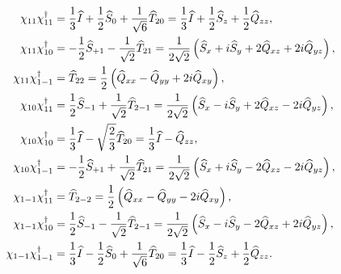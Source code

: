 \begin{align}
\chi_{11} \chi_{11}^{\dagger} & =\frac{1}{3} \widehat{I}+\frac{1}{2} \widehat{S}_{0}+\frac{1}{\sqrt{6}} \widehat{T}_{20}=\frac{1}{3} \widehat{I}+\frac{1}{2} \widehat{S}_{z}+\frac{1}{2} \widehat{Q}_{z z}, \notag\\
\chi_{11} \chi_{10}^{\dagger} & =-\frac{1}{2} \widehat{S}_{+1}-\frac{1}{\sqrt{2}} \widehat{T}_{21}=\frac{1}{2 \sqrt{2}}\left(\widehat{S}_{x}+i \widehat{S}_{y}+2 \widehat{Q}_{x z}+2 i \widehat{Q}_{y z}\right), \notag\\
\chi_{11} \chi_{1-1}^{\dagger} & =\widehat{T}_{22}=\frac{1}{2}\left(\widehat{Q}_{x x}-\widehat{Q}_{y y}+2 i \widehat{Q}_{x y}\right), \notag\\
\chi_{10} \chi_{11}^{\dagger} & =\frac{1}{2} \widehat{S}_{-1}+\frac{1}{\sqrt{2}} \widehat{T}_{2-1}=\frac{1}{2 \sqrt{2}}\left(\widehat{S}_{x}-i \widehat{S}_{y}+2 \widehat{Q}_{x z}-2 i \widehat{Q}_{y z}\right), \notag\\
\chi_{10} \chi_{10}^{\dagger} & =\frac{1}{3} \widehat{I}-\sqrt{\frac{2}{3}} \widehat{T}_{20}=\frac{1}{3} \widehat{I}-\widehat{Q}_{z z}, \label{eq:6:3:22}\\
\chi_{10} \chi_{1-1}^{\dagger} & =-\frac{1}{2} \widehat{S}_{+1}+\frac{1}{\sqrt{2}} \widehat{T}_{21}=\frac{1}{2 \sqrt{2}}\left(\widehat{S}_{x}+i \widehat{S}_{y}-2 \widehat{Q}_{x z}-2 i \widehat{Q}_{y z}\right), \notag\\
\chi_{1-1} \chi_{11}^{\dagger} & =\widehat{T}_{2-2}=\frac{1}{2}\left(\widehat{Q}_{x x}-\widehat{Q}_{y y}-2 i \widehat{Q}_{x y}\right), \notag\\
\chi_{1-1} \chi_{10}^{\dagger} & =\frac{1}{2} \widehat{S}_{-1}-\frac{1}{\sqrt{2}} \widehat{T}_{2-1}=\frac{1}{2 \sqrt{2}}\left(\widehat{S}_{x}-i \widehat{S}_{y}-2 \widehat{Q}_{x z}+2 i \widehat{Q}_{y z}\right), \notag\\
\chi_{1-1} \chi_{1-1}^{\dagger} & =\frac{1}{3} \widehat{I}-\frac{1}{2} \widehat{S}_{0}+\frac{1}{\sqrt{6}} \widehat{T}_{20}=\frac{1}{3} \widehat{I}-\frac{1}{2} \widehat{S}_{z}+\frac{1}{2} \widehat{Q}_{z z} . \notag
\end{align}
